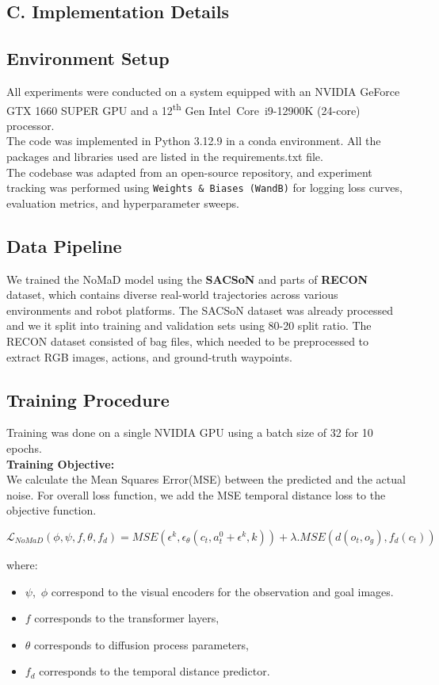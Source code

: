 \documentclass[12pt]{article}
\begin{document}
\subsection*{C. Implementation Details}
\subsection{Environment Setup}
All experiments were conducted on a system equipped with an NVIDIA GeForce GTX 1660 SUPER GPU and a 12\textsuperscript{th} Gen Intel\textregistered~Core\texttrademark~i9-12900K (24-core) processor. \\
The code was implemented in Python 3.12.9 in a conda environment. All the packages and libraries used are listed in the requirements.txt file.\\
The codebase was adapted from an open-source repository, and experiment tracking was performed using \texttt{Weights \& Biases (WandB)} for logging loss curves, evaluation metrics, and hyperparameter sweeps.
\subsection{Data Pipeline}
We trained the NoMaD model using the \textbf{SACSoN} and parts of \textbf{RECON} dataset, which contains diverse real-world trajectories across various environments and robot platforms.
The SACSoN dataset was already processed and we it split into training and validation sets using 80-20 split ratio. The RECON dataset consisted of bag files, which needed to be preprocessed to extract RGB images, actions, and ground-truth waypoints.
\subsection{Training Procedure}
Training was done on a single NVIDIA GPU using a batch size of 32 for 10 epochs.\\
\textbf{Training Objective:}\\
We calculate the Mean Squares Error(MSE) between  the predicted and the actual noise.
For overall loss function, we add the MSE temporal distance loss to the objective function.
\begin{center}
    \[ 
    \mathcal{L}_{NoMaD}(\phi,\psi,f,\theta,f_d) = MSE(\epsilon^{k}, \epsilon_{\theta}(c_t, a^{0}_t + \epsilon^{k},k)) + \lambda .MSE(d(o_t, o_g), f_{d}(c_t))
    \]
 \end{center}
 where:\\
 \begin{itemize}
     \item $\psi$,\ $\phi$ correspond to the visual encoders for the observation and goal images.
     \item $f$ corresponds to the transformer layers,
     \item $\theta$ corresponds to diffusion process parameters,
     \item $f_d$ corresponds to the temporal distance predictor.
 \end{itemize}
\end{document}
